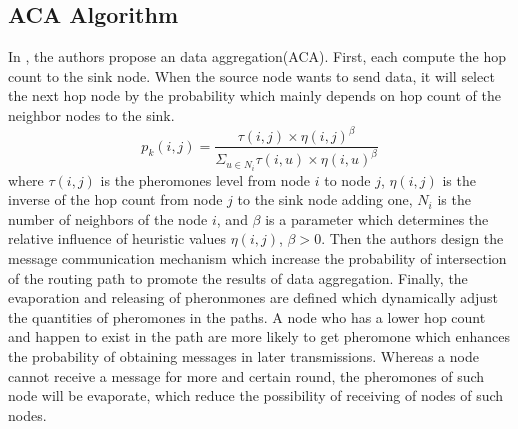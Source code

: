 \documentclass{elsarticle}
\begin{document}
\subsection{ACA Algorithm} \label{ACAAlgorithm}
In \cite{label-10}, the authors propose an data aggregation(ACA). First, each compute the hop count to the sink node. When the source node wants to send data, it will select the next hop node by the probability which mainly depends on hop count of the neighbor nodes to the sink.
\begin{equation}
p_{k}(i,j)=\frac{\tau(i,j) \times \eta(i,j)^{\beta}}{\Sigma_{u \in N_i}\tau(i,u) \times \eta(i,u)^{\beta}} \nonumber
\end{equation}
where $\tau(i,j)$ is the pheromones level from node $i$ to node $j$, $\eta(i,j)$ is the inverse of the hop count from node $j$ to the sink node adding one, $N_i$ is the number of neighbors of the node $i$, and $\beta$ is a parameter which determines the relative influence of heuristic values $\eta(i,j)$, $\beta > 0$.
Then the authors design the message communication mechanism which increase the probability of intersection of the routing path to promote the results of data aggregation.
Finally, the evaporation and releasing of pheronmones are defined which dynamically adjust the quantities of pheromones in the paths. A node who has a lower hop count and happen to exist in the path are more likely to get pheromone which enhances the probability of obtaining messages in later transmissions. Whereas a node cannot receive a message for more and certain round, the pheromones of such node will be evaporate, which reduce the possibility of receiving of nodes of such nodes.
\end{document}

